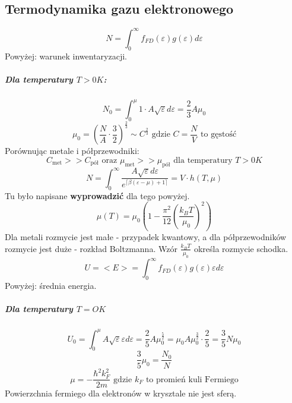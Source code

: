 \documentclass{article}
\begin{document}
		\subsection{Termodynamika gazu elektronowego}
		\begin{equation}
			N = \int_{0}^{\infty}f_{FD}(\varepsilon)g(\varepsilon)d\varepsilon
		\end{equation}
		Powyżej: warunek inwentaryzacji. 
		\subparagraph{Dla temperatury $ T > 0K $:}
		\begin{equation}
			N_0 = \int_{0}^{\mu} 1 \cdot A\sqrt{\varepsilon} d\varepsilon = \frac{2}{3} A\mu_0
		\end{equation}
		\begin{equation}
			\mu_0 = (\frac{N}{A} \cdot \frac{3}{2})^{\frac{2}{3}} \sim C^{\frac{2}{3}}
			\text{ gdzie } C = \frac{N}{V} \text{ to gęstość}
		\end{equation}
		Porównując metale i półprzewodniki:
		\begin{equation}
		C_{\text{met}} >> C_{\text{pół}} \text{ oraz } \mu_{\text{met}} >> \mu_{\text{pół}}
		\text{ dla temperatury } T > 0K
		\end{equation}
		\begin{equation}
			N = \int_{0}^{\infty}\frac{A\sqrt{\varepsilon}d\varepsilon}{e^{\lceil\beta(\varepsilon - \mu)+1\rceil}} =
			V \cdot h(T, \mu)
		\end{equation}
		Tu było napisane \textbf{wyprowadzić} dla tego powyżej.
		\begin{equation}
		\mu(T) = \mu_0(1 - \frac{\pi^2}{12}(\frac{k_BT}{\mu_0})^2)
		\end{equation}
		Dla metali rozmycie jest małe - przypadek kwantowy, a dla półprzewodników rozmycie jest duże - rozkład Boltzmanna. Wzór $ \frac{k_BT}{\mu_0} $ określa rozmycie schodka.
		\begin{equation}
			U = <E> = \int_{0}^{\infty}f_{FD}(\varepsilon)g(\varepsilon)\varepsilon d\varepsilon
		\end{equation}	
		Powyżej: średnia energia.
		\subparagraph{Dla temperatury $ T=OK $}
		\begin{equation}
		U_0 = \int_{0}^{\mu}A\sqrt{\varepsilon}\varepsilon d \varepsilon = 
		\frac{2}{5} A\mu_0^{\frac{5}{2}} = 
		\mu_0 A \mu_0^{\frac{3}{2}}\cdot \frac{2}{5} = 
		\frac{3}{5} N\mu_0
		\end{equation}	
		\begin{equation}
		\frac{3}{5}\mu_0 = \frac{N_0}{N}
		\end{equation}
		\begin{equation}
		\mu = -\frac{\hbar^2k_F^2}{2m} \text{ gdzie } k_F \text{ to promień kuli Fermiego}
		\end{equation}
		Powierzchnia fermiego dla elektronów w krysztale nie jest sferą.
\end{document}
